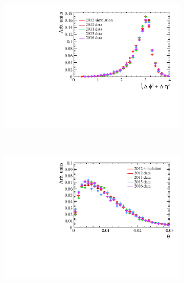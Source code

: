 \begin{figure}
    \centering
    \begin{subfigure}[b]{0.48\textwidth}
        \includegraphics[width=\textwidth]{./Figs/Selection/bkgnf_DeltaR.pdf}
        \caption{ }
        \label{fig:BDTsig}
    \end{subfigure}
    ~ %
    \begin{subfigure}[b]{0.48\textwidth}
       \includegraphics[width=\textwidth]{./Figs/Selection/bkgnd_DIRA.pdf}
        \caption{ }
        \label{fig:BDTbkg}
    \end{subfigure}




\end{figure}

